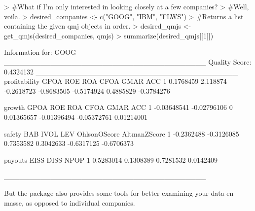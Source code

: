 \documentclass[12pt]{article}
\begin{document}
\begin{Schunk}
\begin{Sinput}
> #What if I'm only interested in looking closely at a few companies? 
> #Well, voila.
> desired_companies <- c("GOOG", "IBM", "FLWS")
> #Returns a list containing the given qmj objects in order.
> desired_qmjs <- get_qmjs(desired_companies, qmjs) 
> summarize(desired_qmjs[[1]])
\end{Sinput}
\begin{Soutput}
Information for:  GOOG
_______________________________________
Quality Score:  0.4324132
_______________________________________
  profitability     GPOA        ROE        ROA       CFOA      GMAR        ACC
1     0.1768459 2.118874 -0.2618723 -0.8683505 -0.5174924 0.4885829 -0.3784276


       growth        GPOA ROE        ROA        CFOA        GMAR        ACC
1 -0.03648541 -0.02796106   0 0.01365657 -0.01396494 -0.05372761 0.01214001


      safety        BAB      IVOL       LEV OhlsonOScore AltmanZScore
1 -0.2362488 -0.3126085 0.7353582 0.3042633   -0.6317125   -0.6706373


    payouts      EISS      DISS      NPOP
1 0.5283014 0.1308389 0.7281532 0.0142409

_______________________________________
\end{Soutput}
\end{Schunk}

But the package also provides some tools for better examining your data en masse, as opposed to individual companies.
\end{document}
